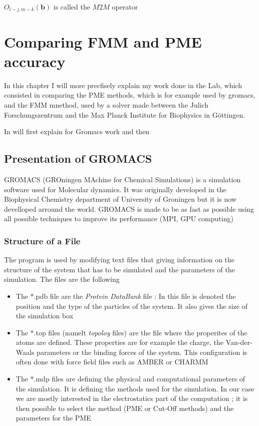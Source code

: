 \documentclass[12pt,twoside,a4paper]{report}
\begin{document}
   $O_{l-j,m-k}(\textbf{b})$ is called the $M2M$ operator



\chapter{Comparing FMM and PME accuracy}

    In this chapter I will more precfisely explain my work done in the Lab, which consisted in comparing the PME methods, which is for example used by gromacs, and the FMM mnethod, used by a solver made between the Julich Forschungszentrum and the Max Planck Institute for Biophysics in Göttingen.

    In will first explain for Gromacs work and then 


\section{Presentation of GROMACS}

    GROMACS (GROningen MAchine for Chemical Simulations) is a simulation software used for Molecular dynamics. It was originally developed in the Biophysical Chemistry department of University of Groningen but it is now develloped arround the world. GROMACS is made to be as fast as possible using all possible techniques to improve its performance (MPI, GPU computing) 
    
   
	\subsection{Structure of a File}
	
	 The program is used  by modifying text files that giving information on the structure of the system that has to be simulated and the parameters of the simulation. The files are the following 
	 
	\begin{itemize}
	
	\item The *.pdb file are the \textit{Protein DataBank} file : In this file is denoted the position and the type of the particles of the system. It also gives the size of the simulation box

	\item The *.top files (namelt \textit{topoloy} files) are the file where the properites of the atoms are defined. These properties are for example the charge, the Van-der-Waals parameters or the binding forces of the system. This configuration is often done with force field files such as AMBER or CHARMM
		 
	\item The *.mdp files are defining the physical and computational parameters of the simulation. It is defining the methods used for the simulation. In our case we are mostly interested in the electrostatics part of the computation ; it is then possible to select the method (PME or Cut-Off methods) and the parameters for the PME
	
	\end{itemize}
		
\end{document}

